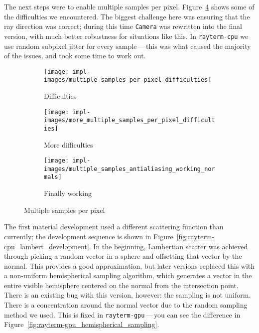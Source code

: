 The next steps were to enable multiple samples per pixel.
Figure~\ref{fig:rayterm-cpu_multisampling} shows some of the difficulties we encountered.
The biggest challenge here was ensuring that the ray direction was correct;
during this time \texttt{Camera} was rewritten into the final version, with much better robustness for situations like this.
In \texttt{rayterm-cpu} we use random subpixel jitter for every sample\,---\,this was what caused the majority of the issues, and took some time to work out.

\vspace{0.3em}
\begin{figure}[htb]
  \centering
  \begin{subfigure}[htb]{0.3\textwidth}
    \texttt{[image: impl-images/multiple\_samples\_per\_pixel\_difficulties]}
    \caption{Difficulties}
\label{fig:rayterm-cpu_multisample_problems}
  \end{subfigure}
  \begin{subfigure}[htb]{0.3\textwidth}
    \texttt{[image: impl-images/more\_multiple\_samples\_per\_pixel\_difficulties]}
    \caption{More difficulties}
\label{fig:rayterm-cpu_multisample_more_problems}
  \end{subfigure}
  \begin{subfigure}[htb]{0.3\textwidth}
    \texttt{[image: impl-images/multiple\_samples\_antialiasing\_working\_normals]}
    \caption{Finally working}
\label{fig:rayterm-cpu_multisample_working}
  \end{subfigure}
  \caption{Multiple samples per pixel}
\label{fig:rayterm-cpu_multisampling}
\end{figure}

The first material development used a different scattering function than currently; the development sequence is shown in Figure~\ref{fig:rayterm-cpu_lambert_development}.
In the beginning, Lambertian scatter was achieved through picking a random vector in a sphere and offsetting that vector by the normal.
This provides a good approximation, but later versions replaced this with a non-uniform hemispherical sampling algorithm, which generates a vector in the entire visible hemisphere centered on the normal from the intersection point.
There is an existing bug with this version, however: the sampling is not uniform.
There is a concentration around the normal vector due to the random sampling method we used.
This is fixed in \texttt{rayterm-gpu}\,---\,you can see the difference in Figure~\ref{fig:rayterm-gpu_hemispherical_sampling}.

